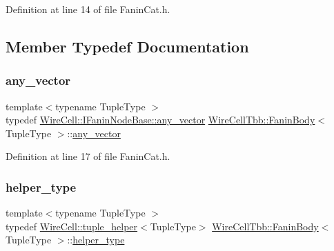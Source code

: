 Definition at line 14 of file Fanin\+Cat.\+h.



\subsection{Member Typedef Documentation}
\mbox{\label{class_wire_cell_tbb_1_1_fanin_body_a774a17ab7c2acdd100a45b298ae1369e}} 
\subsubsection{\texorpdfstring{any\+\_\+vector}{any\_vector}}
{\footnotesize\ttfamily template$<$typename Tuple\+Type $>$ \\
typedef \hyperlink{class_wire_cell_1_1_i_fanin_node_base_a9dc315fe5b56f41f13ea247fc4b7f34b}{Wire\+Cell\+::\+I\+Fanin\+Node\+Base\+::any\+\_\+vector} \hyperlink{class_wire_cell_tbb_1_1_fanin_body}{Wire\+Cell\+Tbb\+::\+Fanin\+Body}$<$ Tuple\+Type $>$\+::\hyperlink{class_wire_cell_tbb_1_1_fanin_body_a774a17ab7c2acdd100a45b298ae1369e}{any\+\_\+vector}}



Definition at line 17 of file Fanin\+Cat.\+h.

\mbox{\label{class_wire_cell_tbb_1_1_fanin_body_aeb3e184395d2e4952aca2dd883f502c1}} 
\subsubsection{\texorpdfstring{helper\+\_\+type}{helper\_type}}
{\footnotesize\ttfamily template$<$typename Tuple\+Type $>$ \\
typedef \hyperlink{struct_wire_cell_1_1tuple__helper}{Wire\+Cell\+::tuple\+\_\+helper}$<$Tuple\+Type$>$ \hyperlink{class_wire_cell_tbb_1_1_fanin_body}{Wire\+Cell\+Tbb\+::\+Fanin\+Body}$<$ Tuple\+Type $>$\+::\hyperlink{class_wire_cell_tbb_1_1_fanin_body_aeb3e184395d2e4952aca2dd883f502c1}{helper\+\_\+type}}



